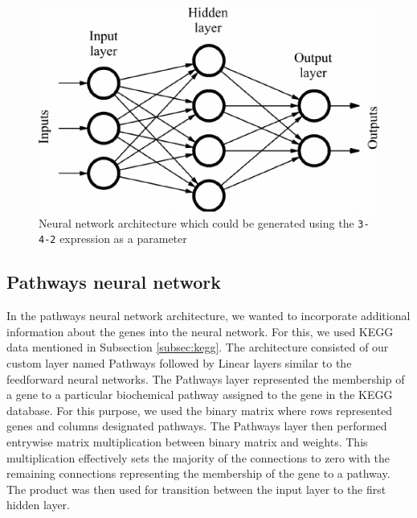\begin{figure}
    \centering
    \includegraphics[width=0.7\linewidth]{images/ff_nn.png}
    \caption{Neural network architecture which could be generated using the \texttt{3-4-2} expression as a parameter}
    \label{fig:ff_nn}
\end{figure}

\subsection{Pathways neural network}
In the pathways neural network architecture, we wanted to incorporate additional information about the genes into the neural network.
For this, we used KEGG data mentioned in Subsection \ref{subsec:kegg}.
The architecture consisted of our custom layer named Pathways followed by Linear layers similar to the feedforward neural networks.
The Pathways layer represented the membership of a gene to a particular biochemical pathway assigned to the gene in the KEGG database.
For this purpose, we used the binary matrix where rows represented genes and columns designated pathways.
The Pathways layer then performed entrywise matrix multiplication between binary matrix and weights.
This multiplication effectively sets the majority of the connections to zero with the remaining connections representing the membership of the gene to a pathway.
The product was then used for transition between the input layer to the first hidden layer.

